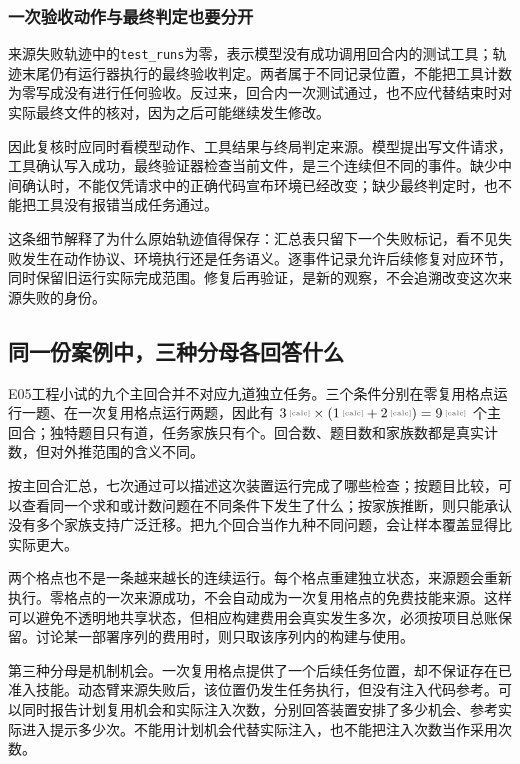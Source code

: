 \subsubsection{一次验收动作与最终判定也要分开}

来源失败轨迹中的\texttt{test\_runs}为零，表示模型没有成功调用回合内的测试工具；轨迹末尾仍有运行器执行的最终验收判定。两者属于不同记录位置，不能把工具计数为零写成没有进行任何验收。反过来，回合内一次测试通过，也不应代替结束时对实际最终文件的核对，因为之后可能继续发生修改。

因此复核时应同时看模型动作、工具结果与终局判定来源。模型提出写文件请求，工具确认写入成功，最终验证器检查当前文件，是三个连续但不同的事件。缺少中间确认时，不能仅凭请求中的正确代码宣布环境已经改变；缺少最终判定时，也不能把工具没有报错当成任务通过。

这条细节解释了为什么原始轨迹值得保存：汇总表只留下一个失败标记，看不见失败发生在动作协议、环境执行还是任务语义。逐事件记录允许后续修复对应环节，同时保留旧运行实际完成范围。修复后再验证，是新的观察，不会追溯改变这次来源失败的身份。

\subsection{同一份案例中，三种分母各回答什么}
\label{sec:ch15-denominators}

E05工程小试的九个主回合并不对应九道独立任务。三个条件分别在零复用格点运行一题、在一次复用格点运行两题，因此有 $\calcnum{3}\times(\calcnum{1}+\calcnum{2})=\calcnum{9}$ 个主回合；独特题目只有道，任务家族只有个。回合数、题目数和家族数都是真实计数，但对外推范围的含义不同。

按主回合汇总，七次通过可以描述这次装置运行完成了哪些检查；按题目比较，可以查看同一个求和或计数问题在不同条件下发生了什么；按家族推断，则只能承认没有多个家族支持广泛迁移。把九个回合当作九种不同问题，会让样本覆盖显得比实际更大。

两个格点也不是一条越来越长的连续运行。每个格点重建独立状态，来源题会重新执行。零格点的一次来源成功，不会自动成为一次复用格点的免费技能来源。这样可以避免不透明地共享状态，但相应构建费用会真实发生多次，必须按项目总账保留。讨论某一部署序列的费用时，则只取该序列内的构建与使用。

第三种分母是机制机会。一次复用格点提供了一个后续任务位置，却不保证存在已准入技能。动态臂来源失败后，该位置仍发生任务执行，但没有注入代码参考。可以同时报告计划复用机会和实际注入次数，分别回答装置安排了多少机会、参考实际进入提示多少次。不能用计划机会代替实际注入，也不能把注入次数当作采用次数。

